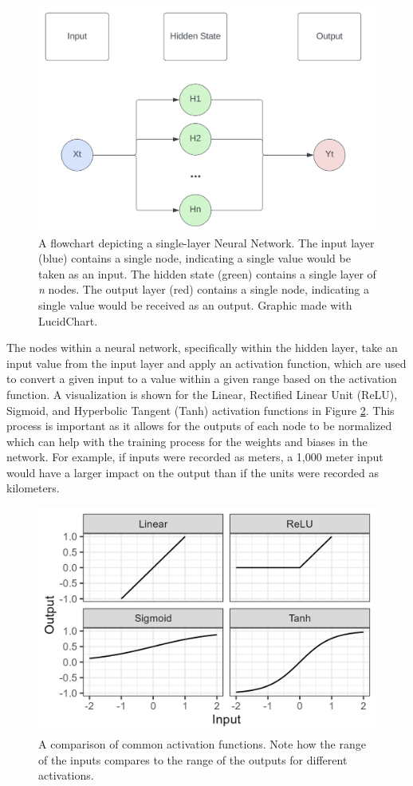 \begin{figure}[ht]
    \centering
    \includegraphics[width=0.8\linewidth]{"Figures/Traditional_NN.png"}
    \caption{A flowchart depicting a single-layer Neural Network. The input layer (blue) contains a single node, indicating a single value would be taken as an input. The hidden state (green) contains a single layer of \textit{n} nodes. The output layer (red) contains a single node, indicating a single value would be received as an output. Graphic made with LucidChart.}
    \label{fig:NueralNetwork}
\end{figure}

The nodes within a neural network, specifically within the hidden layer, take an input value from the input layer and apply an activation function, which are used to convert a given input to a value within a given range based on the activation function. A visualization is shown for the Linear, Rectified Linear Unit (ReLU), Sigmoid, and Hyperbolic Tangent (Tanh) activation functions in Figure \ref{fig:Activations}. This process is important as it allows for the outputs of each node to be normalized which can help with the training process for the weights and biases in the network. For example, if inputs were recorded as meters, a 1,000 meter input would have a larger impact on the output than if the units were recorded as kilometers.

\begin{figure}[ht]
    \centering
    \includegraphics[width=0.8\linewidth]{"Figures/Activations.png"}
    \caption{A comparison of common activation functions. Note how the range of the inputs compares to the range of the outputs for different activations.}
    \label{fig:Activations}
\end{figure}


